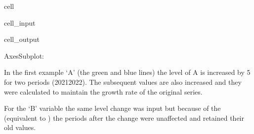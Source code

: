 \documentclass[letterpaper,10pt,english]{jupyterBook}
\begin{document}
\begin{sphinxuseclass}{cell}\begin{sphinxVerbatimInput}

\begin{sphinxuseclass}{cell_input}
\begin{sphinxVerbatim}[commandchars=\\\{\}]

\PYG{p}{[}\PYG{p}{[}\PYG{p}{]}\PYG{p}{]}
    
\end{sphinxVerbatim}

\end{sphinxuseclass}\end{sphinxVerbatimInput}
\begin{sphinxVerbatimOutput}

\begin{sphinxuseclass}{cell_output}
\begin{sphinxVerbatim}[commandchars=\\\{\}]
\PYGZlt{}AxesSubplot:\PYGZgt{}
\end{sphinxVerbatim}

\noindent{}

\end{sphinxuseclass}\end{sphinxVerbatimOutput}

\end{sphinxuseclass}
\sphinxAtStartPar
In the first example ‘A’ (the green and blue lines) the level of A is increased by 5 for two periods (2021\sphinxhyphen{}2022). The subsequent values are also increased and they were calculated to maintain the growth rate of the original series.

\sphinxAtStartPar
For the ‘B’ variable the same level change was input but because of the  (equivalent to ) the periods after the change were unaffected and retained their old values.
\end{document}
